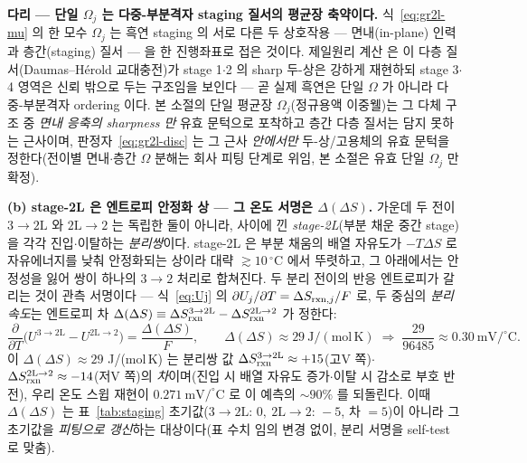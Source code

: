 \begin{srcbox}
\textbf{다리 --- 단일 $\Omega_j$ 는 다중-부분격자 staging 질서의 평균장 축약이다.} 식~\eqref{eq:gr2l-mu} 의 한
모수 $\Omega_j$ 는 흑연 staging 의 서로 다른 두 상호작용 --- 면내(in-plane) 인력과 층간(staging) 질서 --- 을
한 진행좌표로 접은 것이다. 제일원리 계산\cite{persson2010b} 은 이 다층 질서(Daumas--H\'erold 교대충전)가
stage 1$\cdot$2 의 sharp 두-상은 강하게 재현하되 stage 3$\cdot$4 영역은 신뢰 밖으로 두는 구조임을 보인다 ---
곧 실제 흑연은 단일 $\Omega$ 가 아니라 다중-부분격자 ordering 이다. 본 소절의 단일 평균장 $\Omega_j$(정규용액
이중웰)는 그 다체 구조 중 \emph{면내 응축의 sharpness 만} 유효 문턱으로 포착하고 층간 다층 질서는 담지 못하는
근사이며, 판정자~\eqref{eq:gr2l-disc} 는 그 근사 \emph{안에서만} 두-상/고용체의 유효 문턱을 정한다(전이별
면내$\cdot$층간 $\Omega$ 분해는 회사 피팅 단계로 위임, 본 소절은 유효 단일 $\Omega_j$ 만 확정).
\end{srcbox}

\textbf{(b) stage-2L 은 엔트로피 안정화 상 --- 그 온도 서명은 $\Delta(\Delta S)$.} 가운데 두 전이
$3\!\to\!2\mathrm L$ 와 $2\mathrm L\!\to\!2$ 는 독립한 둘이 아니라, 사이에 낀 \emph{stage-2L}(부분 채운 중간 stage)을
각각 진입$\cdot$이탈하는 \emph{분리쌍}이다. stage-2L 은 부분 채움의 배열 자유도가 $-T\Delta S$ 로 자유에너지를
낮춰 안정화되는 상이라 대략 $\gtrsim10\,^\circ$C 에서 뚜렷하고, 그 아래에서는 안정성을 잃어 쌍이 하나의
$3\!\to\!2$ 처리로 합쳐진다. 두 분리 전이의 반응 엔트로피가 갈리는 것이 관측 서명이다 --- 식~\eqref{eq:Uj} 의
$\partial U_j/\partial T=\Delta S_{\mathrm{rxn},j}/F$ 로, 두 중심의 \emph{분리 속도}는 엔트로피 차
$\Delta(\Delta S)\equiv\Delta S_{\mathrm{rxn}}^{3\to2\mathrm L}-\Delta S_{\mathrm{rxn}}^{2\mathrm L\to2}$ 가 정한다:
\begin{equation}
\frac{\partial}{\partial T}\big(U^{3\to2\mathrm L}-U^{2\mathrm L\to2}\big)
=\frac{\Delta(\Delta S)}{F},
\qquad \Delta(\Delta S)\approx29\ \mathrm{J/(mol\,K)}
\;\Rightarrow\;
\frac{29}{96485}\approx0.30\ \mathrm{mV/^\circ C}.
\label{eq:gr2l-split}
\end{equation}
이 $\Delta(\Delta S)\approx29$ J/(mol\,K) 는 분리쌍 값 $\Delta S_{\mathrm{rxn}}^{3\to2\mathrm L}\approx+15$(고V 쪽)$\cdot$
$\Delta S_{\mathrm{rxn}}^{2\mathrm L\to2}\approx-14$(저V 쪽)의 \emph{차}이며(진입 시 배열 자유도 증가$\cdot$이탈 시 감소로
부호 반전), 우리 온도 스윕 재현이 $0.271\ \mathrm{mV/^\circ C}$ 로 이 예측의 $\sim90\%$ 를 되돌린다. 이때
$\Delta(\Delta S)$ 는 표~\ref{tab:staging} 초기값($3\!\to\!2\mathrm L{:}\,0,\ 2\mathrm L\!\to\!2{:}\,-5$, 차 $=5$)이
아니라 그 초기값을 \emph{피팅으로 갱신}하는 대상이다(표 수치 임의 변경 없이, 분리 서명을 self-test 로 맞춤).

